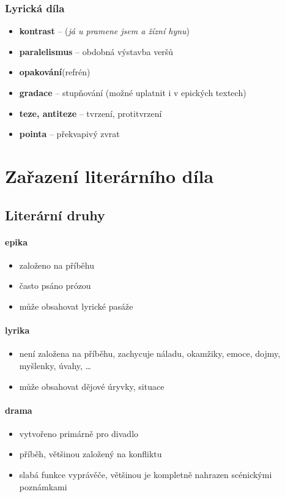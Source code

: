 \subsubsection{Lyrická díla}
\begin{itemize}
\item[] \textbf{kontrast} -- (\textit{já u pramene jsem a žízní hynu})
\item[] \textbf{paralelismus} -- obdobná výstavba veršů
\item[] \textbf{opakování}(refrén)
\item[] \textbf{gradace} -- stupňování (možné uplatnit i v epických textech)
\item[] \textbf{teze, antiteze} -- tvrzení, protitvrzení
\item[] \textbf{pointa} -- překvapivý zvrat
\end{itemize}

\section{Zařazení literárního díla}
\subsection{Literární druhy}
\paragraph{epika} 
\begin{itemize}
\item založeno na příběhu
\item často psáno prózou
\item může obsahovat lyrické pasáže 
\end{itemize}

\paragraph{lyrika}
\begin{itemize}
\item není založena na příběhu, zachycuje náladu, okamžiky, emoce, dojmy, myšlenky, úvahy, \ldots
\item může obsahovat dějové úryvky, situace
\end{itemize}

\paragraph{drama}
\begin{itemize}
\item vytvořeno primárně pro divadlo
\item příběh, většinou založený na konfliktu
\item slabá funkce vyprávěče, většinou je kompletně nahrazen scénickými poznámkami
\end{itemize}


